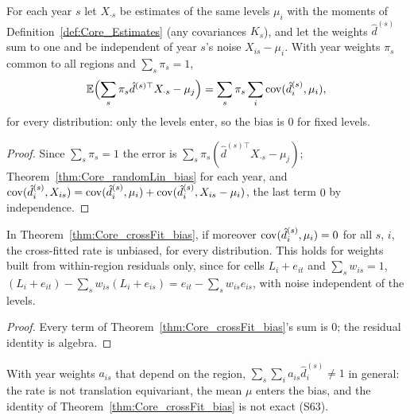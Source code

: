 \begin{theorem}\label{thm:Core_crossFit_bias}
  \leanok
  For each year $s$ let $X_{\cdot s}$ be estimates of the same levels $\mu_i$ with the moments of
  Definition~\ref{def:Core_Estimates} (any covariances $K_s$), and let the weights $\hat d^{(s)}$ sum
  to one and be independent of year $s$'s noise $X_{is} - \mu_i$. With year weights $\pi_s$
  common to all regions and $\sum_s \pi_s = 1$,
  \[
    \mathbb E\Bigl(\sum_s \pi_s \hat d^{(s)\top}X_{\cdot s} - \mu_j\Bigr)
      = \sum_s \pi_s \sum_i \operatorname{cov}(\hat d^{(s)}_i, \mu_i),
  \]
  for every distribution: only the levels enter, so the bias is $0$ for fixed levels.
\end{theorem}
\begin{proof}
  \leanok
  Since $\sum_s\pi_s = 1$ the error is $\sum_s \pi_s(\hat d^{(s)\top}X_{\cdot s} - \mu_j)$;
  Theorem~\ref{thm:Core_randomLin_bias} for each year, and
  $\operatorname{cov}(\hat d^{(s)}_i, X_{is}) = \operatorname{cov}(\hat d^{(s)}_i, \mu_i) + \operatorname{cov}(\hat d^{(s)}_i, X_{is} - \mu_i)$,
  the last term $0$ by independence.
\end{proof}

\begin{corollary}\label{cor:Core_crossFit_unbiased}
  \leanok
  In Theorem~\ref{thm:Core_crossFit_bias}, if moreover $\operatorname{cov}(\hat d^{(s)}_i, \mu_i) = 0$ for all $s$, $i$,
  the cross-fitted rate is unbiased, for every distribution. This holds for weights built from
  within-region residuals only, since for cells $L_i + e_{it}$ and $\sum_s w_{is} = 1$,
  $(L_i + e_{it}) - \sum_s w_{is}(L_i + e_{is}) = e_{it} - \sum_s w_{is}e_{is}$, with noise independent of the levels.
\end{corollary}
\begin{proof}
  \leanok
  Every term of Theorem~\ref{thm:Core_crossFit_bias}'s sum is $0$; the residual identity is algebra.
\end{proof}

\begin{remark}\label{rem:crossFit_region_weights}
  With year weights $a_{is}$ that depend on the region, $\sum_s\sum_i a_{is}\hat d^{(s)}_i \ne 1$ in
  general: the rate is not translation equivariant, the mean $\mu$ enters the bias, and the identity
  of Theorem~\ref{thm:Core_crossFit_bias} is not exact (S63).
\end{remark}

